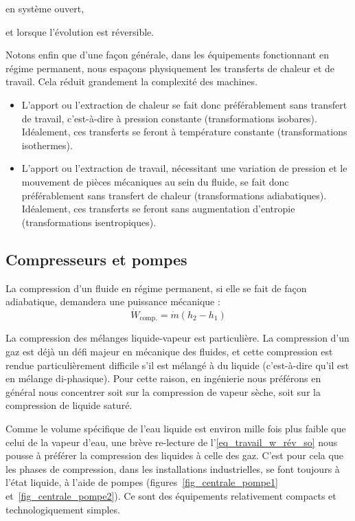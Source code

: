 		\begin{description}
			\item en système ouvert,
			\item et lorsque l’évolution est réversible.
		\end{description}

		Notons enfin que d’une façon générale, dans les équipements fonctionnant en régime permanent, nous espaçons physiquement les transferts de chaleur et de travail. Cela réduit grandement la complexité des machines.

		\begin{itemize}
			\item L’apport ou l’extraction de chaleur se fait donc préférablement sans transfert de travail, c’est-à-dire à pression constante (transformations isobares). Idéalement, ces transferts se feront à température constante (transformations isothermes).
			\item L’apport ou l’extraction de travail, nécessitant une variation de pression et le mouvement de pièces mécaniques au sein du fluide, se fait donc préférablement sans transfert de chaleur (transformations adiabatiques). Idéalement, ces transferts se feront sans augmentation d’entropie (transformations isentropiques).
		\end{itemize}



	\subsection{Compresseurs et pompes}
	\label{ch_moteurs_vapeur_compresseurs_et_pompes}

		La compression d’un fluide en régime permanent, si elle se fait de façon adiabatique, demandera une puissance mécanique :
		\begin{equation}
			\dot{W}_\text{comp.} = \dot{m} (h_2 - h_1)
		\end{equation}

		La compression des mélanges liquide-vapeur est particulière. La compression d’un gaz est déjà un défi majeur en mécanique des fluides, et cette compression est rendue particulièrement difficile s’il est mélangé à du liquide (c’est-à-dire qu’il est en mélange di-phasique). Pour cette raison, en ingénierie nous préférons en général nous concentrer soit sur la compression de vapeur sèche, soit sur la compression de liquide saturé.

		Comme le volume spécifique de l’eau liquide est environ mille fois plus faible que celui de la vapeur d’eau, une brève re-lecture de l’\cref{eq_travail_w_rév_so} nous pousse à préférer la compression des liquides à celle des gaz. C’est pour cela que les phases de compression, dans les installations industrielles, se font toujours à l’état liquide, à l’aide de pompes (figures~\ref{fig_centrale_pompe1} et~\ref{fig_centrale_pompe2}). Ce sont des équipements relativement compacts et technologiquement simples.

